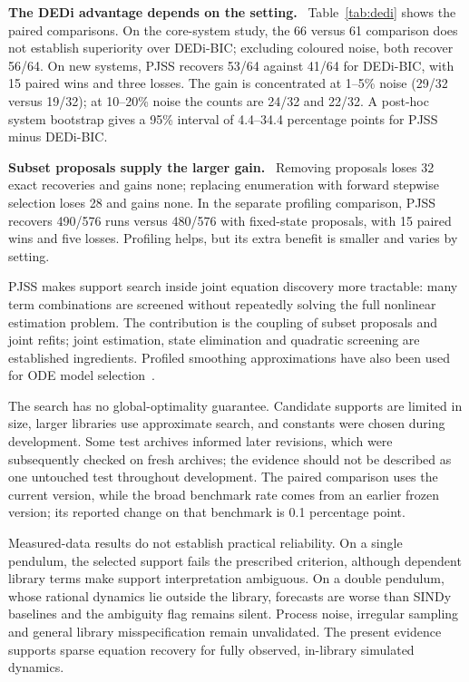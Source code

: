 \documentclass[letterpaper,10pt,twocolumn]{article}
\makeatletter
\newcommand{\lead}[1]{\par\smallskip\noindent\textbf{#1}\ }
\renewcommand\section{\@startsection{section}{1}{\z@}{-2.5ex plus -0.8ex minus -0.2ex}{1.1ex plus 0.2ex}{\normalfont\large\bfseries}}
\makeatother
\begin{document}
\lead{The DEDi advantage depends on the setting.} Table~\ref{tab:dedi} shows the paired comparisons. On the core-system study, the 66 versus 61 comparison does not establish superiority over DEDi-BIC; excluding coloured noise, both recover 56/64. On new systems, PJSS recovers 53/64 against 41/64 for DEDi-BIC, with 15 paired wins and three losses. The gain is concentrated at 1--5\% noise (29/32 versus 19/32); at 10--20\% noise the counts are 24/32 and 22/32. A post-hoc system bootstrap gives a 95\% interval of 4.4--34.4 percentage points for PJSS minus DEDi-BIC.

\lead{Subset proposals supply the larger gain.} Removing proposals loses 32 exact recoveries and gains none; replacing enumeration with forward stepwise selection loses 28 and gains none. In the separate profiling comparison, PJSS recovers 490/576 runs versus 480/576 with fixed-state proposals, with 15 paired wins and five losses. Profiling helps, but its extra benefit is smaller and varies by setting.

\section{What this means and where it fails}
PJSS makes support search inside joint equation discovery more tractable: many term combinations are screened without repeatedly solving the full nonlinear estimation problem. The contribution is the coupling of subset proposals and joint refits; joint estimation, state elimination and quadratic screening are established ingredients. Profiled smoothing approximations have also been used for ODE model selection~\cite{zhang}.

The search has no global-optimality guarantee. Candidate supports are limited in size, larger libraries use approximate search, and constants were chosen during development. Some test archives informed later revisions, which were subsequently checked on fresh archives; the evidence should not be described as one untouched test throughout development. The paired comparison uses the current version, while the broad benchmark rate comes from an earlier frozen version; its reported change on that benchmark is 0.1 percentage point.

Measured-data results do not establish practical reliability. On a single pendulum, the selected support fails the prescribed criterion, although dependent library terms make support interpretation ambiguous. On a double pendulum, whose rational dynamics lie outside the library, forecasts are worse than SINDy baselines and the ambiguity flag remains silent. Process noise, irregular sampling and general library misspecification remain unvalidated. The present evidence supports sparse equation recovery for fully observed, in-library simulated dynamics.
\end{document}
